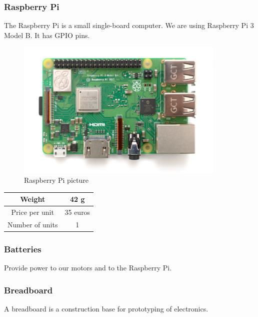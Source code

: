 \subsubsection{Raspberry Pi}
The Raspberry Pi is a small single-board computer. We are using Raspberry Pi 3 Model B. It has GPIO pins.
\begin{figure}[H]
    \centering
    \includegraphics[width=10cm]{img/components/raspberry_pi.png}
    \caption{Raspberry Pi picture}
    \label{fig:Mass plot}
\end{figure}
\begin{center}
    \begin{tabular}{ |c|c| }
        \hline
        Weight          & 42 g      \\
        \hline
        Price per unit  & 35 euros \\
        \hline
        Number of units & 1        \\
        \hline
    \end{tabular}
\end{center}
\subsubsection{Batteries}
Provide power to our motors and to the Raspberry Pi.
\subsubsection{Breadboard}
A breadboard is a construction base for prototyping of electronics.
